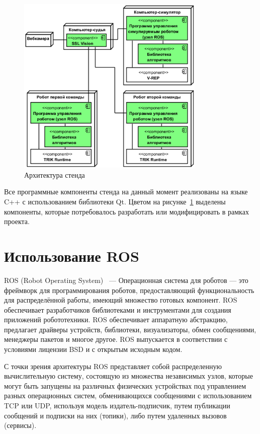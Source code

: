 \documentclass{spisok-article}
\begin{document}
\begin{figure}[ht]
    \centering
    \includegraphics[width=0.8\textwidth]{architecture.png}
    \caption{Архитектура стенда}
    \label{image:architecture}
\end{figure}

Все программные компоненты стенда на данный момент реализованы на языке C++ с использованием библиотеки Qt. Цветом на рисунке~\ref{image:architecture} выделены компоненты, которые потребовалось разработать или модифицировать в рамках проекта.

\section{Использование ROS}

ROS (Robot Operating System)~\cite{quigley2009ros} --- Операционная система для роботов --- это фреймворк для программирования роботов, предоставляющий функциональность для распределённой работы, имеющий множество готовых компонент. ROS обеспечивает разработчиков библиотеками и инструментами для создания приложений робототехники. ROS обеспечивает аппаратную абстракцию, предлагает драйверы устройств, библиотеки, визуализаторы, обмен сообщениями, менеджеры пакетов и многое другое. ROS выпускается в соответствии с условиями лицензии BSD и с открытым исходным кодом.

С точки зрения архитектуры ROS представляет собой распределенную вычислительную систему, состоящую из множества независимых узлов, которые могут быть запущены на различных физических устройствах под управлением разных операционных систем, обменивающихся сообщениями с использованием TCP или UDP, используя модель издатель-подписчик, путем публикации сообщений и подписки на них (топики), либо путем удаленных вызовов (сервисы).
\end{document}
